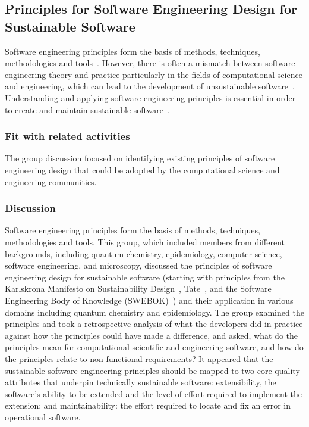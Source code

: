 \subsection{Principles for Software Engineering Design for Sustainable Software} 


Software engineering principles form the basis of methods, techniques,
methodologies and tools~\cite{Vliet:2008}. However, there is often a mismatch
between software engineering theory and practice particularly in the fields of
computational science and engineering, which can lead to the development of
unsustainable software~\cite{Merali:2010,hettrick:2014}. Understanding and
applying software engineering principles is essential in order to create and
maintain sustainable software~\cite{Becker:2016}.

\subsubsection{Fit with related activities}

The group discussion focused on identifying existing principles of software
engineering design that could be adopted by the computational science and
engineering communities.

\subsubsection{Discussion}

Software engineering principles form the basis of methods, techniques,
methodologies and tools. This group, which included members from different
backgrounds, including quantum chemistry, epidemiology, computer science,
software engineering, and microscopy, discussed the principles of software
engineering design for sustainable software (starting with principles from the
Karlskrona Manifesto on Sustainability Design~\cite{Becker:2015},
Tate~\cite{tate:2005}, and the Software Engineering Body of Knowledge
(SWEBOK)~\cite{swebokv3}) and their application in various domains including
quantum chemistry and epidemiology. The group examined the principles and took a
retrospective analysis of what the developers did in practice against how the
principles could have made a difference, and asked, what do the principles mean
for computational scientific and engineering software, and how do the principles
relate to non-functional requirements? It appeared that the sustainable software
engineering principles should be mapped to two core quality attributes that
underpin technically sustainable software: extensibility, the software's ability
to be extended and the level of effort required to implement the extension; and
maintainability: the effort required to locate and fix an error in operational
software.

